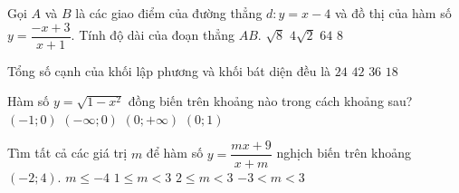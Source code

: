 \begin{ex}%
Gọi $A$ và $B$ là các giao điểm của đường thẳng $d: y=x-4$ và đồ thị của hàm số $y=\dfrac{-x+3}{x+1}$. Tính độ dài của đoạn thẳng $AB$.
\choice
{$\sqrt{8}$}
{$4\sqrt{2}$}
{$64$}
{\True $8$}
\end{ex}

\begin{ex}%
Tổng số cạnh của khối lập phương và khối bát diện đều là
\choice
{\True $24$}
{$42$}
{$36$}
{$18$}
\end{ex}

\begin{ex}%
Hàm số $y=\sqrt{1-x^2}$ đồng biến trên khoảng nào trong cách khoảng sau?
\choice
{\True $(-1;0)$}
{$(-\infty;0)$}
{$(0;+\infty)$}
{$(0;1)$}
\end{ex}

\begin{ex}%
Tìm tất cả các giá trị $m$ để hàm số $y=\dfrac{mx+9}{x+m}$ nghịch biến trên khoảng $(-2;4)$.
\choice
{$m\le -4$}
{$1\le m<3$}
{\True $2\le m<3$}
{$-3<m<3$}
\end{ex} 

